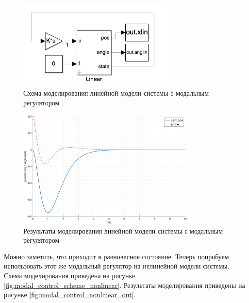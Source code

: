 \begin{figure}[ht!]
    \centering
    \includegraphics[width=0.7\textwidth]{media/modal_control_linear_scheme.png}
    \caption{Схема моделирования линейной модели системы с модальным регулятором}
    \label{fig:modal_control_scheme_linear}
\end{figure}
\begin{figure}[ht!]
    \centering
    \includegraphics[width=0.8\textwidth]{media/plots/modal_control/modal_control_linear_out_0.png}
    \caption{Результаты моделирования линейной модели системы с модальным регулятором}
    \label{fig:modal_control_linear_out}
\end{figure}

Можно заметить, что приходит в равновесное состояние. Теперь попробуем использовать этот же 
модальный регулятор на нелинейной модели системы. Схема моделирования приведена на
рисунке \ref{fig:modal_control_scheme_nonlinear}. Результаты моделирования приведены на
рисунке \ref{fig:modal_control_nonlinear_out}.


